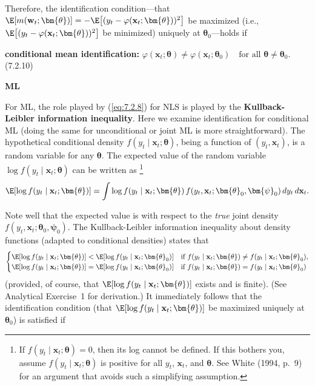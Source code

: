 Therefore, the identification condition---that $\E[m(\mathbf{w}_t; \bm{\theta})] = -\E\bigl[(y_t - \varphi(\mathbf{x}_t; \bm{\theta}))^2\bigr]$ be maximized (i.e., $\E\bigl[(y_t - \varphi(\mathbf{x}_t; \bm{\theta}))^2\bigr]$ be minimized) uniquely at $\bm{\theta}_0$---holds if

\begin{defbox}
\textbf{conditional mean identification:} $\varphi(\mathbf{x}_t; \bm{\theta}) \neq \varphi(\mathbf{x}_t; \bm{\theta}_0) \quad \text{for all } \bm{\theta} \neq \bm{\theta}_0$. \hfill (7.2.10)
\end{defbox}

\medskip
\noindent\textbf{ML}

\medskip
For ML, the role played by (\ref{eq:7.2.8}) for NLS is played by the \textbf{Kullback-Leibler information inequality}. Here we examine identification for conditional ML (doing the same for unconditional or joint ML is more straightforward). The hypothetical conditional density $f(y_t \mid \mathbf{x}_t; \bm{\theta})$, being a function of $(y_t, \mathbf{x}_t)$, is a random variable for any $\bm{\theta}$. The expected value of the random variable $\log f(y_t \mid \mathbf{x}_t; \bm{\theta})$ can be written as%
\footnote{If $f(y_t \mid \mathbf{x}_t; \bm{\theta}) = 0$, then its log cannot be defined. If this bothers you, assume $f(y_t \mid \mathbf{x}_t; \bm{\theta})$ is positive for all $y_t$, $\mathbf{x}_t$, and $\bm{\theta}$. See White (1994, p.~9) for an argument that avoids such a simplifying assumption.}
\begin{equation}
\label{eq:7.2.11}
\E[\log f(y_t \mid \mathbf{x}_t; \bm{\theta})] = \int \log f(y_t \mid \mathbf{x}_t; \bm{\theta}) \, f(y_t, \mathbf{x}_t; \bm{\theta}_0, \bm{\psi}_0) \, dy_t \, d\mathbf{x}_t.
\end{equation}

Note well that the expected value is with respect to the \emph{true} joint density $f(y_t, \mathbf{x}_t; \bm{\theta}_0, \bm{\psi}_0)$. The Kullback-Leibler information inequality about density functions (adapted to conditional densities) states that
\begin{equation}
\label{eq:7.2.12}
\begin{cases}
\E[\log f(y_t \mid \mathbf{x}_t; \bm{\theta})] < \E[\log f(y_t \mid \mathbf{x}_t; \bm{\theta}_0)] & \text{if } f(y_t \mid \mathbf{x}_t; \bm{\theta}) \neq f(y_t \mid \mathbf{x}_t; \bm{\theta}_0), \\
\E[\log f(y_t \mid \mathbf{x}_t; \bm{\theta})] = \E[\log f(y_t \mid \mathbf{x}_t; \bm{\theta}_0)] & \text{if } f(y_t \mid \mathbf{x}_t; \bm{\theta}) = f(y_t \mid \mathbf{x}_t; \bm{\theta}_0)
\end{cases}
\end{equation}
(provided, of course, that $\E[\log f(y_t \mid \mathbf{x}_t; \bm{\theta})]$ exists and is finite). (See Analytical Exercise~1 for derivation.) It immediately follows that the identification condition (that $\E[\log f(y_t \mid \mathbf{x}_t; \bm{\theta})]$ be maximized uniquely at $\bm{\theta}_0$) is satisfied if

